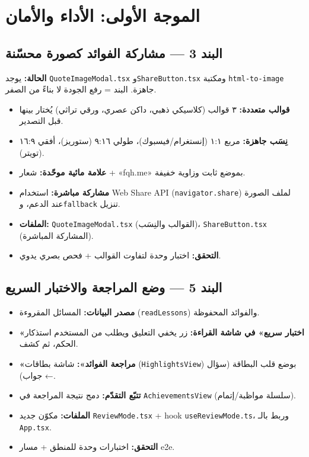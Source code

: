 \documentclass[11pt]{article}
\begin{document}
\section{الموجة الأولى: الأداء والأمان}

\subsection{البند 3 — مشاركة الفوائد كصورة محسّنة}

\begin{notebox}
\textbf{الحالة:} يوجد \texttt{QuoteImageModal.tsx} و\texttt{ShareButton.tsx} ومكتبة \texttt{html-to-image}
جاهزة. البند = رفع الجودة لا بناءً من الصفر.
\end{notebox}

\begin{itemize}
  \item \textbf{قوالب متعددة:} ٣ قوالب (كلاسيكي ذهبي، داكن عصري، ورقي تراثي) يُختار بينها قبل التصدير.
  \item \textbf{نِسَب جاهزة:} مربع ١:١ (إنستغرام/فيسبوك)، طولي ٩:١٦ (ستوريز)، أفقي ١٦:٩ (تويتر).
  \item \textbf{علامة مائية موحّدة:} شعار + «fqh.me» بموضع ثابت وزاوية خفيفة.
  \item \textbf{مشاركة مباشرة:} استخدام Web Share API (\texttt{navigator.share}) لملف الصورة عند الدعم،
        و\texttt{fallback} تنزيل.
  \item \textbf{الملفات:} \texttt{QuoteImageModal.tsx} (القوالب والنِسَب)، \texttt{ShareButton.tsx} (المشاركة المباشرة).
  \item \textbf{التحقق:} اختبار وحدة لتفاوت القوالب + فحص بصري يدوي.
\end{itemize}

\subsection{البند 5 — وضع المراجعة والاختبار السريع}

\begin{itemize}
  \item \textbf{مصدر البيانات:} المسائل المقروءة (\texttt{readLessons}) والفوائد المحفوظة.
  \item \textbf{«اختبار سريع» في شاشة القراءة:} زر يخفي التعليق ويطلب من المستخدم استذكار الحكم، ثم كشف.
  \item \textbf{«مراجعة الفوائد»:} شاشة بطاقات (\texttt{HighlightsView}) بوضع قلب البطاقة (سؤال ← جواب).
  \item \textbf{تتبّع التقدّم:} دمج نتيجة المراجعة في \texttt{AchievementsView} (سلسلة مواظبة/إتمام).
  \item \textbf{الملفات:} مكوّن جديد \texttt{ReviewMode.tsx} + hook \texttt{useReviewMode.ts}، وربط بالـ \texttt{App.tsx}.
  \item \textbf{التحقق:} اختبارات وحدة للمنطق + مسار e2e.
\end{itemize}
\end{document}
